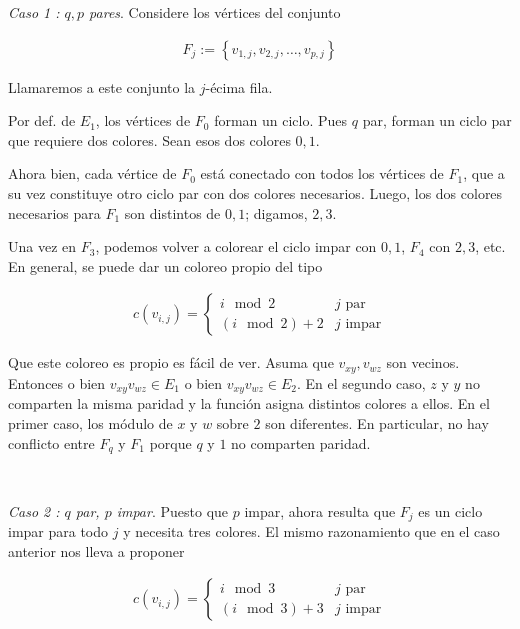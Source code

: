 \documentclass[a4paper, 12pt]{article}
\begin{document}
\textit{Caso 1 : $q, p $ pares}. Considere los vértices del conjunto

\begin{align*}
    F_j := \left\{   v_{1, j}, v_{2, j}, \ldots, v_{p, j}  \right\}
\end{align*}

Llamaremos a este conjunto la $j$-écima fila. 

Por def. de $E_1$, los vértices de $F_0$ forman un ciclo. Pues $q$ par, forman
un ciclo par que requiere dos colores. Sean esos dos colores $0, 1$.

Ahora bien, cada vértice de $F_0$ está conectado con todos los vértices de
$F_{1}$, que a su vez constituye otro ciclo par con dos colores necesarios.
Luego, los dos colores necesarios para $F_{1}$ son distintos de $0, 1$;
digamos, $2, 3$.

Una vez en $F_3$, podemos volver a colorear el ciclo impar con $0, 1$, $F_4$
con $2, 3$, etc. En general, se puede dar un coloreo propio del tipo 

\begin{align*}
    c(v_{i, j}) = \begin{cases}
        i \mod 2 & j \text{ par } \\ 
        (i \mod 2) + 2 & j \text{ impar}
    \end{cases}
\end{align*}

Que este coloreo es propio es fácil de ver. Asuma que $v_{xy}, v_{wz}$ son
vecinos. Entonces o bien $v_{xy}v_{wz} \in E_1$ o bien $v_{xy}v_{wz} \in E_2$.
En el segundo caso, $z$ y $y$ no comparten la misma paridad y la función asigna
distintos colores a ellos. En el primer caso, los módulo de $x$ y $w$ sobre $2$
son diferentes. En particular, no hay conflicto entre $F_{q}$ y $F_1$ porque
$q$ y $1$ no comparten paridad.

~ 

\textit{Caso 2 : $q$ par, $p$ impar}. Puesto que $p$ impar, ahora resulta que $F_j$ es un ciclo 
impar para todo $j$ y necesita tres colores. El mismo razonamiento que en el caso 
anterior nos lleva a proponer

\begin{align*}
    c(v_{i, j}) = \begin{cases}
        i \mod 3 & j \text{ par } \\ 
        (i \mod 3) + 3 & j \text{ impar}
    \end{cases}
\end{align*}
\end{document}
